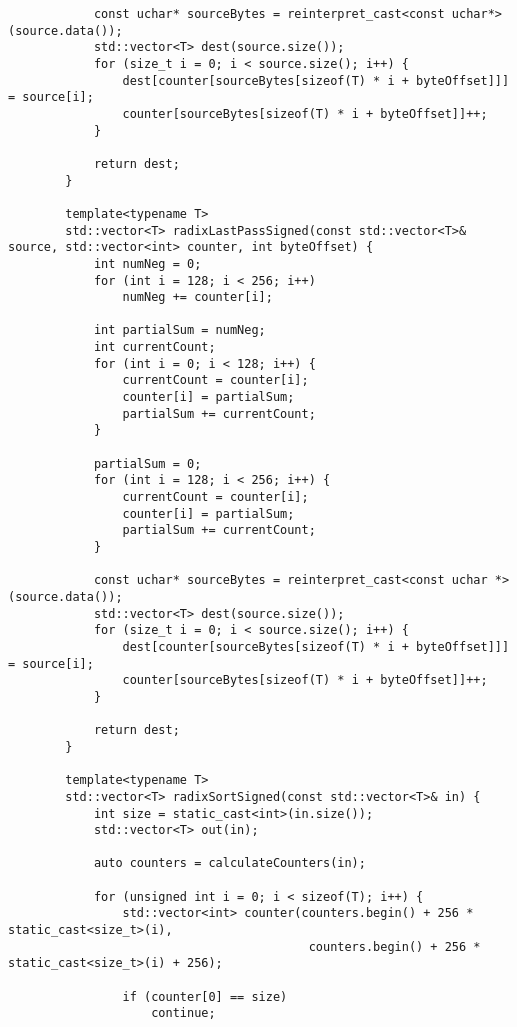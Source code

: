 \documentclass{report}
\begin{document}
\begin{lstlisting}
            const uchar* sourceBytes = reinterpret_cast<const uchar*>(source.data());
            std::vector<T> dest(source.size());
            for (size_t i = 0; i < source.size(); i++) {
                dest[counter[sourceBytes[sizeof(T) * i + byteOffset]]] = source[i];
                counter[sourceBytes[sizeof(T) * i + byteOffset]]++;
            }
        
            return dest;
        }
        
        template<typename T>
        std::vector<T> radixLastPassSigned(const std::vector<T>& source, std::vector<int> counter, int byteOffset) {
            int numNeg = 0;
            for (int i = 128; i < 256; i++)
                numNeg += counter[i];
        
            int partialSum = numNeg;
            int currentCount;
            for (int i = 0; i < 128; i++) {
                currentCount = counter[i];
                counter[i] = partialSum;
                partialSum += currentCount;
            }
        
            partialSum = 0;
            for (int i = 128; i < 256; i++) {
                currentCount = counter[i];
                counter[i] = partialSum;
                partialSum += currentCount;
            }
        
            const uchar* sourceBytes = reinterpret_cast<const uchar *>(source.data());
            std::vector<T> dest(source.size());
            for (size_t i = 0; i < source.size(); i++) {
                dest[counter[sourceBytes[sizeof(T) * i + byteOffset]]] = source[i];
                counter[sourceBytes[sizeof(T) * i + byteOffset]]++;
            }
        
            return dest;
        }
        
        template<typename T>
        std::vector<T> radixSortSigned(const std::vector<T>& in) {
            int size = static_cast<int>(in.size());
            std::vector<T> out(in);
        
            auto counters = calculateCounters(in);
        
            for (unsigned int i = 0; i < sizeof(T); i++) {
                std::vector<int> counter(counters.begin() + 256 * static_cast<size_t>(i),
                                          counters.begin() + 256 * static_cast<size_t>(i) + 256);
        
                if (counter[0] == size)
                    continue;
        

\end{lstlisting}
\end{document}
